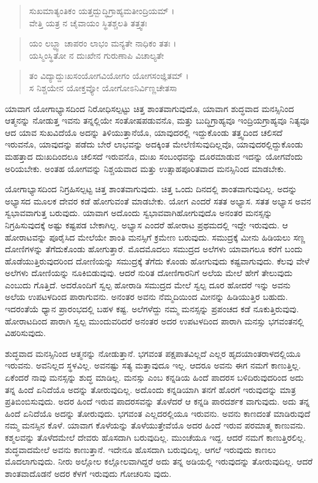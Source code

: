 \begin{verse}
ಸುಖಮಾತ್ಯಂತಿಕಂ ಯತ್ತದ್ಬುದ್ಧಿಗ್ರಾಹ್ಯಮತೀಂದ್ರಿಯಮ್ ।\\ವೇತ್ತಿ ಯತ್ರ ನ ಚೈವಾಯಂ ಸ್ಥಿತಶ್ಚಲತಿ ತತ್ತ್ವತಃ 
\end{verse}

\begin{verse}
ಯಂ ಲಬ್ಧ್ವಾ ಚಾಪರಂ ಲಾಭಂ ಮನ್ಯತೇ ನಾಧಿಕಂ ತತಃ ।\\ಯಸ್ಮಿಂಸ್ಥಿತೋ ನ ದುಃಖೇನ ಗುರುಣಾಪಿ ವಿಚಾಲ್ಯತೇ 
\end{verse}

\begin{verse}
ತಂ ವಿದ್ಯಾದ್ದುಃಖಸಂಯೋಗವಿಯೋಗಂ ಯೋಗಸಂಜ್ಞಿತಮ್ ।\\ಸ ನಿಶ್ಚಯೇನ ಯೋಕ್ತವ್ಯೋ ಯೋಗೋಽನಿರ್ವಿಣ್ಣಚೇತಸಾ 
\end{verse}

{\small ಯಾವಾಗ ಯೋಗಾಭ್ಯಾಸದಿಂದ ನಿರೋಧಿಸಲ್ಪಟ್ಟು ಚಿತ್ತ ಶಾಂತವಾಗುವುದೊ, ಯಾವಾಗ ಶುದ್ಧವಾದ ಮನಸ್ಸಿನಿಂದ ಆತ್ಮನನ್ನು ನೋಡುತ್ತ ಇವನು ತನ್ನಲ್ಲಿಯೇ ಸಂತೋಷಪಡುವನೊ, ಮತ್ತು ಬುದ್ಧಿಗ್ರಾಹ್ಯವೂ ಇಂದ್ರಿಯಗ್ರಾಹ್ಯವೂ ನಿತ್ಯವೂ ಆದ ಯಾವ ಸುಖವಿದೆಯೊ ಅದನ್ನು ತಿಳಿಯುತ್ತಾನೆಯೊ, ಯಾವುದರಲ್ಲಿ ಇದ್ದುಕೊಂಡು ತತ್ತ್ವದಿಂದ ಚಲಿಸದೆ ಇರುವನೊ, ಯಾವುದನ್ನು ಪಡೆದು ಬೇರೆ ಲಾಭವನ್ನು ಅದಕ್ಕಿಂತ ಮೇಲೆಣಿಸುವುದಿಲ್ಲವೊ, ಯಾವುದರಲ್ಲಿದ್ದುಕೊಂಡು ಮಹತ್ತಾದ ದುಃಖದಿಂದಲೂ ಚಲಿಸದೆ ಇರುವನೊ, ದುಃಖ ಸಂಬಂಧವನ್ನು ದೂರಮಾಡುವ ಇದನ್ನು ಯೋಗವೆಂದು ಅರಿಯಬೇಕು. ಅಂತಹ ಯೋಗವನ್ನು ನಿಶ್ಚಯವಾದ ಮತ್ತು ಉತ್ಸಾಹಪೂರಿತವಾದ ಮನಸ್ಸಿನಿಂದ ಮಾಡಬೇಕು.}

ಯೋಗಾಭ್ಯಾಸದಿಂದ ನಿಗ್ರಹಿಸಲ್ಪಟ್ಟ ಚಿತ್ತ ಶಾಂತವಾಗುವುದು. ಚಿತ್ತ ಒಂದು ದಿನದಲ್ಲಿ ಶಾಂತವಾಗುವುದಿಲ್ಲ. ಅದನ್ನು ಅಭ್ಯಾಸದ ಮೂಲಕ ದೇವರ ಕಡೆ ಹೋಗುವಂತೆ ಮಾಡಬೇಕು. ಯೋಗ ಎಂದರೆ ಸತತ ಅಭ್ಯಾಸ. ಸತತ ಅಭ್ಯಾಸ ಅವನ ಸ್ವಭಾವವಾಗುತ್ತ ಬರುವುದು. ಯಾವಾಗ ಅದೊಂದು ಸ್ವಭಾವವಾಗಿಹೋಗುವುದೊ ಅನಂತರ ಮನಸ್ಸನ್ನು ನಿಗ್ರಹಿಸುವುದಕ್ಕೆ ಅಷ್ಟು ಕಷ್ಟಪಡ ಬೇಕಾಗಿಲ್ಲ. ಅಭ್ಯಾಸ ಎಂದರೆ ಹೋರಾಟ ಪ್ರಥಮದಲ್ಲಿ ಇದ್ದೇ ಇರುವುದು. ಆ ಹೋರಾಟವನ್ನು ಪೂರೈಸಿದ ಮೇಲೆಯೇ ಶಾಂತಿ ಮನಸ್ಸಿಗೆ ಕ್ರಮೇಣ ಬರುವುದು. ಸಮುದ್ರಕ್ಕೆ ಮೀನು ಹಿಡಿಯಲು ಸಣ್ಣ ದೋಣಿಗಳನ್ನು ತೆಗೆದುಕೊಂಡು ಹೋಗುತ್ತಾರೆ. ಮೊದಮೊದಲು ಸಮುದ್ರದ ಅಲೆಗಳು ಯಾವಾಗಲೂ ಕರೆಗೆ ಬಂದು ಹೊಡೆಯುತ್ತಿರುವುದರಿಂದ ದೋಣಿಯನ್ನು ಸಮುದ್ರಕ್ಕೆ ತೆಗೆದು ಕೊಂಡು ಹೋಗುವುದು ಕಷ್ಟವಾಗುವುದು. ಕೆಲವು ವೇಳೆ ಅಲೆಗಳು ದೋಣಿಯನ್ನು ನೂಕಿಬಿಡುವುವು. ಆದರೆ ನುರಿತ ದೋಣಿಗಾರನಿಗೆ ಅಲೆಯ ಮೇಲೆ ಹೇಗೆ ತೇಲುವುದು ಎಂಬುದು ಗೊತ್ತಿದೆ. ಅದರೊಂದಿಗೆ ಸ್ವಲ್ಪ ಹೋರಾಡಿ ಸಮುದ್ರದ ಮೇಲೆ ಸ್ವಲ್ಪ ದೂರ ಹೋದರೆ ಇನ್ನು ಅವನು ಅಲೆಯ ಉಪಟಳದಿಂದ ಪಾರಾಗುವನು. ಅನಂತರ ಅವನು ನೆಮ್ಮದಿಯಿಂದ ಮೀನನ್ನು ಹಿಡಿಯುತ್ತಿರ ಬಹುದು. ಇದರಂತೆಯೆ ಧ್ಯಾನ ಪ್ರಾರಂಭದಲ್ಲಿ ಬಹಳ ಕಷ್ಟ. ಅಲೆಗಳೆದ್ದು ನಮ್ಮ ಮನಸ್ಸನ್ನು ಪ್ರಪಂಚದ ಕಡೆ ನೂಕುತ್ತಿರುವುವು. ಹೋರಾಟದಿಂದ ಪಾರಾಗಿ ಸ್ವಲ್ಪ ಮುಂದುವರಿದರೆ ಅನಂತರ ಅದರ ಉಪಟಳದಿಂದ ಪಾರಾಗಿ ಮನಸ್ಸು ಭಗವಂತನಲ್ಲಿ ವಿಹರಿಸುವುದು.

ಶುದ್ಧವಾದ ಮನಸ್ಸಿನಿಂದ ಆತ್ಮನನ್ನು ನೋಡುತ್ತಾನೆ. ಭಗವಂತ ಪಕ್ಷಪಾತವಿಲ್ಲದೆ ಎಲ್ಲರ ಹೃದಯಾಂತರಾಳದಲ್ಲಿಯೂ ಇರುವನು. ಅವನಿಲ್ಲದ ಸ್ಥಳವಿಲ್ಲ. ಅವನಷ್ಟು ಸತ್ಯ ಮತ್ತಾವುದೂ ಇಲ್ಲ. ಆದರೂ ಅವನು ಈಗ ನಮಗೆ ಕಾಣುತ್ತಿಲ್ಲ. ಏಕೆಂದರೆ ನಾವು ಮನಸ್ಸನ್ನು ಶುದ್ಧ ಮಾಡಿಲ್ಲ. ಮನಸ್ಸು ಎಂಬ ಕನ್ನಡಿಯ ಹಿಂದೆ ಪಾದರಸ ಬಳಿದಿರುವುದರಿಂದ ಅದು ತನ್ನ ಹಿಂದೆ ಏನಿದೆಯೊ ಅದನ್ನು ತೋರುವುದಿಲ್ಲ. ಅದೊಂದು ಕನ್ನಡಿಯಾಗಿ ತನಗೆ ಹೊರಗೆ ಇರುವುದನ್ನು ಮಾತ್ರ ಪ್ರತಿಬಿಂಬಿಸುವುದು. ಅದರ ಹಿಂದೆ ಇರುವ ಪಾದರಸವನ್ನು ತೊಳೆದರೆ ಆ ಕನ್ನಡಿ ಪಾರದರ್ಶಕ ವಾಗುವುದು. ಅದು ತನ್ನ ಹಿಂದೆ ಏನಿದೆಯೊ ಅದನ್ನು ತೋರುವುದು. ಭಗವಂತ ಎಲ್ಲದರಲ್ಲಿಯೂ ಇರುವನು. ಅವನು ಕಾಣದಂತೆ ಮಾಡಿರುವುದೆ ನಮ್ಮ ಮನಸ್ಸಿನ ಕೊಳೆ. ಯಾವಾಗ ಕೊಳೆಯನ್ನು ತೊಳೆಯುತ್ತೇವೆಯೊ ಅದರ ಹಿಂದೆ ಇರುವ ಪರಮಾತ್ಮ ಕಾಣುವನು. ಕಶ್ಮಲವನ್ನು ತೊಳೆದಮೇಲೆ ದೇವರು ಹೊಸದಾಗಿ ಬರುವುದಿಲ್ಲ. ಮುಂಚೆಯೂ ಇದ್ದ. ಆದರೆ ನಮಗೆ ಕಾಣುತ್ತಿರಲಿಲ್ಲ. ಶುದ್ಧವಾದಮೇಲೆ ಅವನು ಕಾಣುತ್ತಾನೆ. ಇದೇನೂ ಹೊಸದಾಗಿ ಬರುವುದಿಲ್ಲ. ಆಗಲೆ ಇರುವುದು ಕಾಣಲು ಮೊದಲಾಗುವುದು. ನೀರು ಅಲ್ಲೋಲ ಕಲ್ಲೋಲವಾಗಿದ್ದರೆ ಅದು ತನ್ನ ಅಡಿಯಲ್ಲಿ ಇರುವುದನ್ನು ತೋರುವುದಿಲ್ಲ. ಆದರೆ ಶಾಂತವಾದೊಡನೆ ಅದರ ಕೆಳಗೆ ಇರುವುದು ಗೋಚರಿಸು ವುದು.

